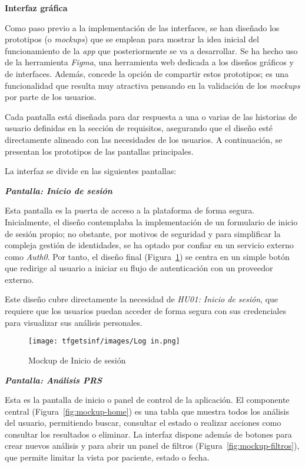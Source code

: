\textbf{Interfaz gráfica}

Como paso previo a la implementación de las interfaces, se han diseñado los prototipos (o \textit{mockups}) que se emplean para mostrar la idea inicial del funcionamiento de la \textit{app} que posteriormente se va a desarrollar. Se ha hecho uso de la herramienta \textit{Figma}, una herramienta web dedicada a los diseños gráficos y de interfaces. Además, concede la opción de compartir estos prototipos; es una funcionalidad que resulta muy atractiva pensando en la validación de los \textit{mockups} por parte de los usuarios.

Cada pantalla está diseñada para dar respuesta a una o varias de las historias de usuario definidas en la sección de requisitos, asegurando que el diseño esté directamente alineado con las necesidades de los usuarios. A continuación, se presentan los prototipos de las pantallas principales.

\noindent La interfaz se divide en las siguientes pantallas:

\vspace{0.8em}
\noindent\textbf{\textit{Pantalla: Inicio de sesión}}
\vspace{0.8em}

Esta pantalla es la puerta de acceso a la plataforma de forma segura. Inicialmente, el diseño contemplaba la implementación de un formulario de inicio de sesión propio; no obstante, por motivos de seguridad y para simplificar la compleja gestión de identidades, se ha optado por confiar en un servicio externo como \textit{Auth0}. Por tanto, el diseño final (Figura~\ref{fig:mockup-login}) se centra en un simple botón que redirige al usuario a iniciar su flujo de autenticación con un proveedor externo.

 Este diseño cubre directamente la necesidad de \textit{HU01: Inicio de sesión}, que requiere que los usuarios puedan acceder de forma segura con sus credenciales para visualizar sus análisis personales.

\begin{figure}[H]
    \centering
    \texttt{[image: tfgetsinf/images/Log in.png]}
    \caption{Mockup de Inicio de sesión}
    \label{fig:mockup-login}
\end{figure}

\vspace{0.8em}
\noindent\textbf{\textit{Pantalla: Análisis PRS}}
\vspace{0.8em}

Esta es la pantalla de inicio o panel de control de la aplicación. El componente central (Figura~\ref{fig:mockup-home}) es una tabla que muestra todos los análisis del usuario, permitiendo buscar, consultar el estado o realizar acciones como consultar los resultados o eliminar. La interfaz dispone además de botones para crear nuevos análisis y para abrir un panel de filtros (Figura~\ref{fig:mockup-filtros}), que permite limitar la vista por paciente, estado o fecha.

